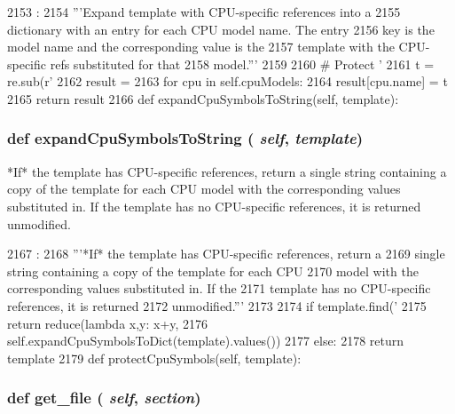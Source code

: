 \begin{DoxyCode}
2153                                               :
2154         '''Expand template with CPU-specific references into a
2155         dictionary with an entry for each CPU model name.  The entry
2156         key is the model name and the corresponding value is the
2157         template with the CPU-specific refs substituted for that
2158         model.'''
2159 
2160         # Protect '%
2161         t = re.sub(r'%
2162         result = {}
2163         for cpu in self.cpuModels:
2164             result[cpu.name] = t %
2165         return result
2166 
    def expandCpuSymbolsToString(self, template):
\end{DoxyCode}
\hypertarget{classisa__parser_1_1ISAParser_a83ebf1a3fa500d1349a978fd6ad0f128}{
\subsubsection[{expandCpuSymbolsToString}]{\setlength{\rightskip}{0pt plus 5cm}def expandCpuSymbolsToString ( {\em self}, \/   {\em template})}}
\label{classisa__parser_1_1ISAParser_a83ebf1a3fa500d1349a978fd6ad0f128}
\begin{DoxyVerb}*If* the template has CPU-specific references, return a
single string containing a copy of the template for each CPU
model with the corresponding values substituted in.  If the
template has no CPU-specific references, it is returned
unmodified.\end{DoxyVerb}
 


\begin{DoxyCode}
2167                                                 :
2168         '''*If* the template has CPU-specific references, return a
2169         single string containing a copy of the template for each CPU
2170         model with the corresponding values substituted in.  If the
2171         template has no CPU-specific references, it is returned
2172         unmodified.'''
2173 
2174         if template.find('%
2175             return reduce(lambda x,y: x+y,
2176                           self.expandCpuSymbolsToDict(template).values())
2177         else:
2178             return template
2179 
    def protectCpuSymbols(self, template):
\end{DoxyCode}
\hypertarget{classisa__parser_1_1ISAParser_a6ac21a60543e62e29cd947a8e9af0424}{
\subsubsection[{get\_\-file}]{\setlength{\rightskip}{0pt plus 5cm}def get\_\-file ( {\em self}, \/   {\em section})}}
\label{classisa__parser_1_1ISAParser_a6ac21a60543e62e29cd947a8e9af0424}



